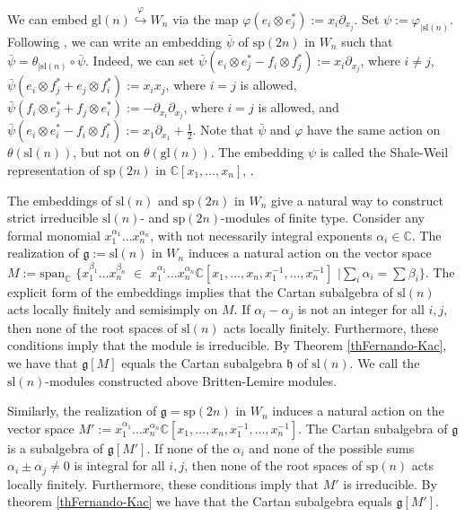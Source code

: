 \documentclass[12pt]{report}
\newcommand {\CC} {\mathbb {C}}
\newcommand{\hh}{\mathfrak{h}}
\newcommand{\gG}{\mathfrak{g}}
\renewcommand {\phi} {\varphi}
\newcommand{\sL}{\mathrm{sl}}
\newcommand{\sP}{\mathrm{sp}}
\newcommand{\linspan}{\mathrm{span}}
\newcommand{\gl}{\mathrm{gl}}
\begin{document}
We can embed $\gl(n)\stackrel{\phi}{\hookrightarrow} W_n$ via the map $\phi (e_i\otimes e_j^*):= x_i\partial_{x_j}$. Set $\psi:=\phi_{|\sL(n)}$. Following \cite{Mathieu}, we can write an embedding $\bar{\psi}$ of $\sP(2n)$ in $W_n$ such that $\bar\psi=\theta_{|\sL(n)}\circ\bar{\psi}$. Indeed, we can set $\bar \psi(e_i\otimes e_j^*-f_i\otimes f_j^*):=x_i\partial_{x_j}$, where  $i\neq j$,  $\bar\psi(e_i\otimes f_j^*+e_j\otimes f_i^*):= x_ix_j$, where $i=j$ is allowed, $\bar \psi(f_i\otimes e_j^*+f_j\otimes e_i^*):= -\partial_{x_i}\partial_{x_j}$, where $i=j$ is allowed, and $\bar\psi(e_i\otimes e_i^*-f_i\otimes f_i^*):=x_1\partial_{x_1}+\frac{1}{2} $. Note that $\bar \psi$ and $\phi$ have the same action on $\theta(\sL(n))$, but not on $\theta(\gl(n))$. The embedding $\psi$ is called the Shale-Weil representation of $\sP(2n)$ in $\CC[x_1,\dots, x_n]$, \cite{Mathieu}.

The embeddings of $\sL(n)$ and $\sP(2n)$ in $W_n$ give a natural way to construct strict irreducible $\sL(n)$- and $\sP(2n)$-modules of finite type. Consider any formal monomial $x_1^{\alpha_1}\dots x_n^{\alpha_n}$, with not necessarily integral exponents $\alpha_i\in\CC$. The realization of $\gG:=\sL(n)$ in $W_n$ induces a natural action on the vector space $M:=\linspan_{\CC}$ $\{x_1^{\beta_1}\dots x_n^{\beta_n} $ $\in$ $x_1^{\alpha_1} \dots x_n^{\alpha_n}  \CC[x_1, \dots, x_n, x_1^{-1},\dots,x_n^{-1}]$ $| \sum_i\alpha_i=\sum\beta_i\}$. The explicit form of the embeddings implies that the Cartan subalgebra of $\sL(n)$ acts locally finitely and semisimply on $M$. If $\alpha_i-\alpha_j$ is not an integer for all $i,j$, then none of the root spaces of $\sL(n)$ acts locally finitely. Furthermore, these conditions imply that the module is irreducible. By Theorem \ref{thFernando-Kac}, we have that $\gG[M]$ equals the Cartan subalgebra $\hh$ of $\sL(n)$. We call the $\sL(n)$-modules constructed above Britten-Lemire modules. %

Similarly, the realization of $\gG=\sP(2n)$  in $W_n$ induces a natural action on the vector space $M':=x_1^{\alpha_1}\dots x_n^{\alpha_n}\CC[x_1,\dots, x_n, x_1^{-1},\dots,x_n^{-1}]$. The Cartan subalgebra of $\gG$ is a subalgebra of $\gG[M']$. If none of the $\alpha_i$ and none of the possible sums $ \alpha_i\pm\alpha_j\neq 0$ is integral for all $i,j$, then none of the root spaces of $\sP(n)$ acts locally finitely. Furthermore, these conditions imply that $M'$ is irreducible. By theorem \ref{thFernando-Kac} we have that the Cartan subalgebra equals $\gG[M']$.
\end{document}
